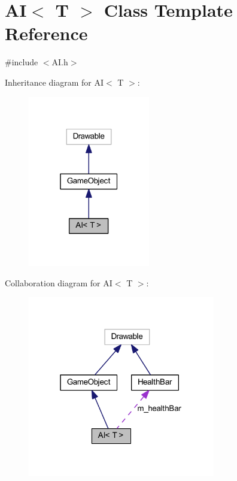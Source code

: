\hypertarget{class_a_i}{}\section{AI$<$ T $>$ Class Template Reference}
\label{class_a_i}


{\ttfamily \#include $<$A\+I.\+h$>$}



Inheritance diagram for AI$<$ T $>$\+:
\nopagebreak
\begin{figure}[H]
\begin{center}
\leavevmode
\includegraphics[width=151pt]{class_a_i__inherit__graph}
\end{center}
\end{figure}


Collaboration diagram for AI$<$ T $>$\+:
\nopagebreak
\begin{figure}[H]
\begin{center}
\leavevmode
\includegraphics[width=232pt]{class_a_i__coll__graph}
\end{center}
\end{figure}
